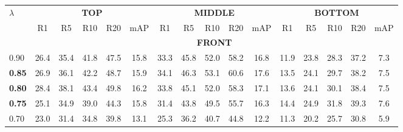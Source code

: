 \documentclass[preprint,12pt]{elsarticle}
\begin{document}
\begin{landscape}
\begin{table}[H] 
\captionsetup{justification=justified}
\label{table3}
\centering
\begin{tabular}{l|ccccc|ccccc|ccccc}
		\hline
		\bf $\lambda$& \multicolumn{5}{c|}{\bf TOP} &\multicolumn{5}{c|}{\bf MIDDLE} &\multicolumn{5}{c}{\bf BOTTOM}\\ \cline{2-16}
		&\multicolumn{1}{p{0.9cm}}{R1} & \multicolumn{1}{p{0.9cm}}{R5} & \multicolumn{1}{p{0.9cm}}{R10} & \multicolumn{1}{p{0.9cm}}{R20} & \multicolumn{1}{p{0.9cm}|}{mAP}&\multicolumn{1}{p{0.9cm}}{R1} & \multicolumn{1}{p{0.9cm}}{R5} & \multicolumn{1}{p{0.9cm}}{R10} & \multicolumn{1}{p{0.9cm}}{R20} & \multicolumn{1}{p{0.9cm}|}{mAP}&\multicolumn{1}{p{0.9cm}}{R1} & \multicolumn{1}{p{0.9cm}}{R5} & \multicolumn{1}{p{0.9cm}}{R10} & \multicolumn{1}{p{0.9cm}}{R20} & \multicolumn{1}{p{0.9cm}}{mAP}\\
		\hline
		& \multicolumn{5}{c}{} &\multicolumn{5}{c}{\bf FRONT} &\multicolumn{5}{c}{}\\ \cline{2-16}
		\hline
		0.90 &26.4&35.4&41.8&47.5&15.8&33.3&45.8&52.0&58.2&16.8&11.9&23.8&28.3&37.2&7.3\\[0.4ex]
	\bf	0.85 &26.9&36.1&42.2&48.7&15.9&34.1&46.3&53.1&60.6&17.6&13.5&24.1&29.7&38.2&7.5\\[0.4ex]
	\bf	0.80 &28.4&38.1&43.4&49.8&16.2&33.8&45.1&52.0&58.3&17.1&13.6&24.1&30.1&38.4&7.5\\[0.4ex]
	\bf	0.75 &25.1&34.9&39.0&44.3&15.8&31.4&43.8&49.5&55.7&16.3&14.4&24.9&31.8&39.3&7.6\\[0.4ex]
		0.70 &23.0&31.4&34.8&39.8&13.1&25.3&36.2&40.7&44.8&12.2&11.3&20.2&25.7&30.8&5.9\\[0.4ex]


\end{tabular}
\end{table}
\end{landscape}
\end{document}
